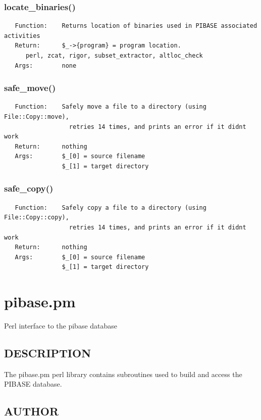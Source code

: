 \documentclass{article}
\begin{document}
\subsubsection*{locate\_binaries()\label{pibase_pm_locate_binaries_}}
\begin{verbatim}
   Function:    Returns location of binaries used in PIBASE associated activities
   Return:      $_->{program} = program location.
      perl, zcat, rigor, subset_extractor, altloc_check
   Args:        none
\end{verbatim}
\subsubsection*{safe\_move()\label{pibase_pm_safe_move_}}
\begin{verbatim}
   Function:    Safely move a file to a directory (using File::Copy::move),
                  retries 14 times, and prints an error if it didnt work
   Return:      nothing
   Args:        $_[0] = source filename
                $_[1] = target directory
\end{verbatim}
\subsubsection*{safe\_copy()\label{pibase_pm_safe_copy_}}
\begin{verbatim}
   Function:    Safely copy a file to a directory (using File::Copy::copy),
                  retries 14 times, and prints an error if it didnt work
   Return:      nothing
   Args:        $_[0] = source filename
                $_[1] = target directory
\end{verbatim}
\clearpage
\section{pibase.pm\label{pibase_pm}}


Perl interface to the pibase database

\subsection*{DESCRIPTION\label{pibase_pm_DESCRIPTION}}


The pibase.pm perl library contains subroutines used to build and access the
PIBASE database.

\subsection*{AUTHOR\label{pibase_pm_AUTHOR}}
\end{document}
